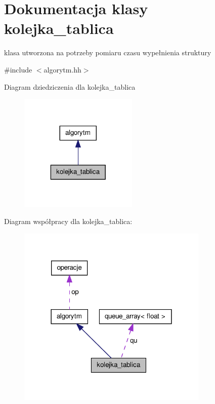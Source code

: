 \hypertarget{classkolejka__tablica}{\section{\-Dokumentacja klasy kolejka\-\_\-tablica}
\label{classkolejka__tablica}
}


klasa utworzona na potrzeby pomiaru czasu wypełnienia struktury  




{\ttfamily \#include $<$algorytm.\-hh$>$}



\-Diagram dziedziczenia dla kolejka\-\_\-tablica\nopagebreak
\begin{figure}[H]
\begin{center}
\leavevmode
\includegraphics[width=160pt]{classkolejka__tablica__inherit__graph}
\end{center}
\end{figure}


\-Diagram współpracy dla kolejka\-\_\-tablica\-:\nopagebreak
\begin{figure}[H]
\begin{center}
\leavevmode
\includegraphics[width=258pt]{classkolejka__tablica__coll__graph}
\end{center}
\end{figure}
